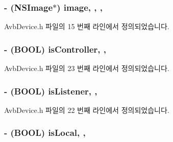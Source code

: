 \subsubsection[{\texorpdfstring{image}{image}}]{\setlength{\rightskip}{0pt plus 5cm}-\/ (N\+S\+Image$\ast$) image\hspace{0.3cm}{\ttfamily [read]}, {\ttfamily [write]}, {\ttfamily [atomic]}, {\ttfamily [copy]}}\hypertarget{interface_avb_device_a790b3bb624b6e726d31a50b21eb69854}{}\label{interface_avb_device_a790b3bb624b6e726d31a50b21eb69854}


Avb\+Device.\+h 파일의 15 번째 라인에서 정의되었습니다.

\subsubsection[{\texorpdfstring{is\+Controller}{isController}}]{\setlength{\rightskip}{0pt plus 5cm}-\/ (B\+O\+OL) is\+Controller\hspace{0.3cm}{\ttfamily [read]}, {\ttfamily [write]}, {\ttfamily [atomic]}}\hypertarget{interface_avb_device_adf3d67f37d278fcb4a584572d2d48d60}{}\label{interface_avb_device_adf3d67f37d278fcb4a584572d2d48d60}


Avb\+Device.\+h 파일의 23 번째 라인에서 정의되었습니다.

\subsubsection[{\texorpdfstring{is\+Listener}{isListener}}]{\setlength{\rightskip}{0pt plus 5cm}-\/ (B\+O\+OL) is\+Listener\hspace{0.3cm}{\ttfamily [read]}, {\ttfamily [write]}, {\ttfamily [atomic]}}\hypertarget{interface_avb_device_a66a5987226b8fa5309dc6a4deb6a7165}{}\label{interface_avb_device_a66a5987226b8fa5309dc6a4deb6a7165}


Avb\+Device.\+h 파일의 22 번째 라인에서 정의되었습니다.

\subsubsection[{\texorpdfstring{is\+Local}{isLocal}}]{\setlength{\rightskip}{0pt plus 5cm}-\/ (B\+O\+OL) is\+Local\hspace{0.3cm}{\ttfamily [read]}, {\ttfamily [write]}, {\ttfamily [atomic]}}\hypertarget{interface_avb_device_a80370dd37373223251e9e63628e66d5b}{}\label{interface_avb_device_a80370dd37373223251e9e63628e66d5b}


